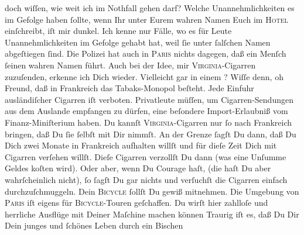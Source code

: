 \begin{ledgroupsized}[t]{13cm}
               doch wiſſen, wie weit ich im Nothfall gehen darf?\pend
           \pstart
           Welche Unannehmlichkeiten es im Gefolge haben ſollte, wenn Ihr unter Eurem wahren
               Namen Euch im \textsc{Hotel} einſchreibt, iſt mir dunkel. Ich kenne
               nur Fälle, wo es für Leute {\pb} Unannehmlichkeiten im Gefolge gehabt hat, weil ſie unter ſalſchen Namen
               abgeſtiegen ſind. Die Polizei hat auch in \textsc{Paris} nichts dagegen, daß ein Menſch ſeinen wahren Namen führt.\pend
           \pstart
           Auch bei der Idee, mir \textsc{Virginia}-Cigarren zuzuſenden,
               erkenne ich Dich wieder. Vielleicht gar in einem \label{K_L02806-888v}\label{K_L02806-888h}? Wiſſe denn, oh Freund, daß in Frankreich
               das Tabaks-Monopol beſteht. Jede Einfuhr 
               ausländiſcher Cigarren iſt verboten. Privatleute müſſen, um Cigarren-Sendungen  aus dem {\pb}Auslande
               empfangen zu dürfen, eine beſondere Import-Erlaubniß vom Finanz-Miniſterium haben. Du kannſt \textsc{Virginia}-Cigarren nur ſo nach Frankreich
               bringen, daß Du ſie ſelbſt mit Dir nimmſt. An der Grenze ſagſt Du dann, daß Du Dich
               zwei Monate in Frankreich aufhalten willſt und
               für dieſe Zeit Dich mit Cigarren verſehen willſt. Dieſe Cigarren verzollſt Du dann
               (was eine Unſumme  Geldes koſten wird). Oder aber,
               wenn Du Courage haſt, (die haſt Du aber wahrſcheinlich nicht), {\pb}ſo ſagſt Du gar nichts und verſuchſt die Cigarren
               einfach durchzuſchmuggeln.\pend
           \pstart
           Dein \textsc{Bicycle} ſollſt Du gewiß mitnehmen. Die Umgebung von
                  \textsc{Paris} iſt eigens für \textsc{Bicycle}-Touren geſchaffen. Du wirſt
               hier zahlloſe und herrliche Ausflüge mit Deiner Maſchine machen können{\dotsfive}\pend
           \pstart
           Traurig iſt es, daß Du Dir Dein junges und ſchönes Leben  durch ein Bischen \label{K_L02806-22v}
\end{ledgroupsized}
